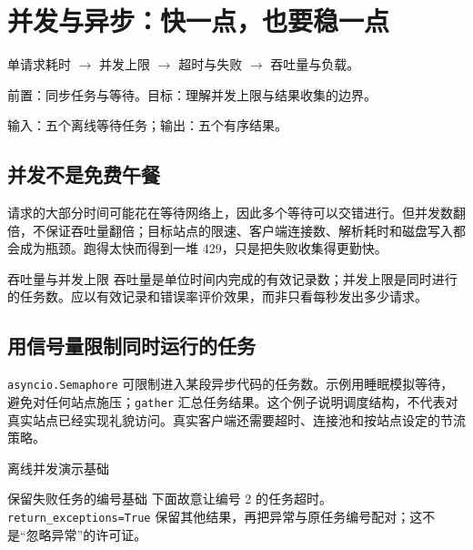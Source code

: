 \chapter{并发与异步：快一点，也要稳一点}\label{ch:concurrency}
\begin{tcolorbox}[title=章首知识地图,colframe=Ink]
单请求耗时 $\longrightarrow$ 并发上限 $\longrightarrow$ 超时与失败 $\longrightarrow$ 吞吐量与负载。
\end{tcolorbox}

\begin{tcolorbox}[title=学习目标与前置知识,colframe=Ink!65,colback=Ink!2]
前置：同步任务与等待。目标：理解并发上限与结果收集的边界。\par
输入：五个离线等待任务；输出：五个有序结果。
\end{tcolorbox}

\section{并发不是免费午餐}
请求的大部分时间可能花在等待网络上，因此多个等待可以交错进行。但并发数翻倍，不保证吞吐量翻倍；目标站点的限速、客户端连接数、解析耗时和磁盘写入都会成为瓶颈。跑得太快而得到一堆 429，只是把失败收集得更勤快。

\begin{definition}{吞吐量与并发上限}
吞吐量是单位时间内完成的有效记录数；并发上限是同时进行的任务数。应以有效记录和错误率评价效果，而非只看每秒发出多少请求。
\end{definition}

\section{用信号量限制同时运行的任务}
\texttt{asyncio.Semaphore} 可限制进入某段异步代码的任务数。示例用睡眠模拟等待，避免对任何站点施压；\texttt{gather} 汇总任务结果。这个例子说明调度结构，不代表对真实站点已经实现礼貌访问。真实客户端还需要超时、连接池和按站点设定的节流策略。

\begin{example}{离线并发演示}{基础}
\end{example}

\begin{example}{保留失败任务的编号}{基础}
下面故意让编号 2 的任务超时。\texttt{return\_exceptions=True} 保留其他结果，再把异常与原任务编号配对；这不是“忽略异常”的许可证。
\end{example}

